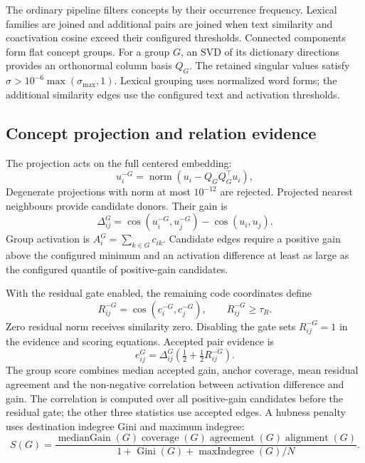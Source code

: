 \documentclass{article}
\begin{document}
The ordinary pipeline filters concepts by their occurrence frequency. Lexical
families are joined and additional pairs are joined when text similarity and
coactivation cosine exceed their configured thresholds. Connected components
form flat concept groups. For a group $G$, an SVD of its dictionary directions
provides an orthonormal column basis $Q_G$. The retained singular values satisfy
$\sigma>10^{-6}\max(\sigma_{\max},1)$.
Lexical grouping uses normalized word forms; the additional similarity edges
use the configured text and activation thresholds.

\subsection{Concept projection and relation evidence}
The projection acts on the full centered embedding:
\begin{equation}
 u_i^{-G}=\operatorname{norm}\!\left(u_i-Q_GQ_G^\top u_i\right),
 \label{eq:projection}
\end{equation}
Degenerate projections with norm at most $10^{-12}$ are rejected. Projected
nearest neighbours provide candidate donors. Their gain is
\begin{equation}
 \Delta_{ij}^{G}=\cos(u_i^{-G},u_j^{-G})-\cos(u_i,u_j).
\end{equation}
Group activation is $A_i^G=\sum_{k\in G}c_{ik}$. Candidate edges require a positive
gain above the configured minimum and an activation difference at least as large as the
configured quantile of positive-gain candidates.

With the residual gate enabled, the remaining code coordinates define
\begin{equation}
 R_{ij}^{-G}=\cos(c_i^{-G},c_j^{-G}),\qquad R_{ij}^{-G}\geq\tau_R.
\end{equation}
Zero residual norm receives similarity zero. Disabling the gate sets
$R_{ij}^{-G}=1$ in the evidence and scoring equations. Accepted pair evidence is
\begin{equation}
 e_{ij}^{G}=\Delta_{ij}^{G}\left(\tfrac12+\tfrac12R_{ij}^{-G}\right).
\end{equation}
The group score combines median accepted gain, anchor coverage, mean residual
agreement and the non-negative correlation between activation difference and gain.
The correlation is computed over all positive-gain candidates before the residual
gate; the other three statistics use accepted edges.
A hubness penalty uses destination indegree Gini and maximum indegree:
\begin{equation}
 S(G)=\frac{\operatorname{medianGain}(G)\operatorname{coverage}(G)
 \operatorname{agreement}(G)\operatorname{alignment}(G)}
 {1+\operatorname{Gini}(G)+\operatorname{maxIndegree}(G)/N}.
\end{equation}
\end{document}
